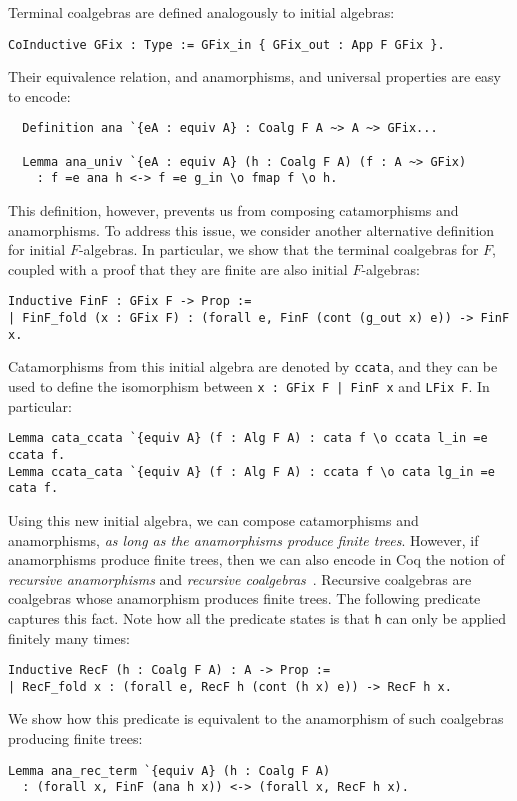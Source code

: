 \documentclass[a4paper, UKenglish, cleveref, autoref, thm-restate]{lipics-v2021}
\begin{document}
Terminal coalgebras are defined analogously to initial algebras:
\begin{verbatim}
CoInductive GFix : Type := GFix_in { GFix_out : App F GFix }.
\end{verbatim}
Their equivalence relation, and anamorphisms, and universal properties are
easy to encode:
\begin{verbatim}
  Definition ana `{eA : equiv A} : Coalg F A ~> A ~> GFix...

  Lemma ana_univ `{eA : equiv A} (h : Coalg F A) (f : A ~> GFix)
    : f =e ana h <-> f =e g_in \o fmap f \o h.
\end{verbatim}
This definition, however, prevents us from composing catamorphisms and
anamorphisms. To address this issue, we consider another alternative definition
for initial $F$-algebras. In particular, we show that the terminal coalgebras
for $F$, coupled with a proof that they are finite are also initial
$F$-algebras:
\begin{verbatim}
Inductive FinF : GFix F -> Prop :=
| FinF_fold (x : GFix F) : (forall e, FinF (cont (g_out x) e)) -> FinF x.
\end{verbatim}
Catamorphisms from this initial algebra are denoted by \texttt{ccata},
and they can be used to define the isomorphism between 
\texttt{{x : GFix F | FinF x}} and
\texttt{LFix F}. In particular: 
\begin{verbatim}
Lemma cata_ccata `{equiv A} (f : Alg F A) : cata f \o ccata l_in =e ccata f.
Lemma ccata_cata `{equiv A} (f : Alg F A) : ccata f \o cata lg_in =e cata f.
\end{verbatim}
Using this new initial algebra, we can compose catamorphisms and anamorphisms,
\emph{as long as the anamorphisms produce finite trees}. However, if
anamorphisms produce finite trees, then we can also encode in Coq the notion of
\emph{recursive anamorphisms} and \emph{recursive coalgebras}~\cite{TODO}.
Recursive coalgebras are coalgebras whose anamorphism produces finite trees.
The following predicate captures this fact. Note how all the predicate states
is that \texttt{h} can only be applied finitely many times:
\begin{verbatim}
Inductive RecF (h : Coalg F A) : A -> Prop :=
| RecF_fold x : (forall e, RecF h (cont (h x) e)) -> RecF h x.
\end{verbatim}
We show how this predicate is equivalent to the anamorphism of such coalgebras
producing finite trees:
\begin{verbatim}
Lemma ana_rec_term `{equiv A} (h : Coalg F A)
  : (forall x, FinF (ana h x)) <-> (forall x, RecF h x).
\end{verbatim}
\end{document}
